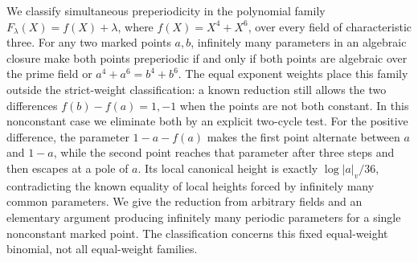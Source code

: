 We classify simultaneous preperiodicity in the polynomial family
$F_\lambda(X)=f(X)+\lambda$, where $f(X)=X^4+X^6$, over every field
of characteristic three.
For any two marked points $a,b$, infinitely many parameters in an
algebraic closure make both points preperiodic if and only if both
points are algebraic over the prime field or $a^4+a^6=b^4+b^6$.
The equal exponent weights place this family outside the strict-weight
classification: a known reduction still allows the two differences
$f(b)-f(a)=1,-1$ when the points are not both constant. In this
nonconstant case we eliminate both by an explicit two-cycle test.
For the positive difference, the parameter $1-a-f(a)$ makes the first
point alternate between $a$ and $1-a$, while the second point reaches
that parameter after three steps and then escapes at a pole of $a$.
Its local canonical height is exactly $\log|a|_v/36$, contradicting
the known equality of local heights forced by infinitely many common
parameters. We give the reduction from arbitrary fields and an
elementary argument producing infinitely many periodic parameters for
a single nonconstant marked point. The classification concerns this
fixed equal-weight binomial, not all equal-weight families.
